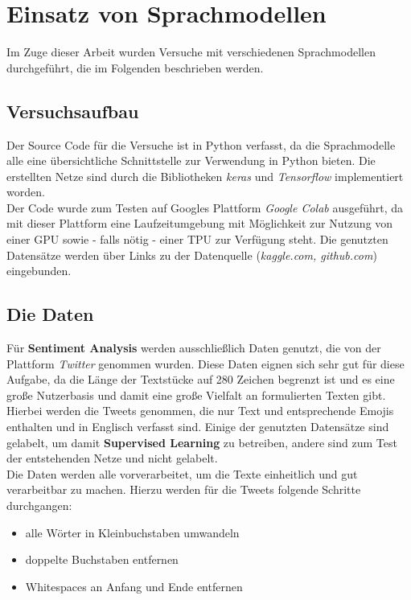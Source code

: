 \chapter{Einsatz von Sprachmodellen}
Im Zuge dieser Arbeit wurden Versuche mit verschiedenen Sprachmodellen durchgef\"uhrt, die im Folgenden beschrieben werden.

\section{Versuchsaufbau}
Der Source Code f\"ur die Versuche ist in Python verfasst, da die Sprachmodelle alle eine \"ubersichtliche Schnittstelle zur Verwendung in Python bieten. Die erstellten Netze sind durch die Bibliotheken \textit{keras} \cite{keras} und \textit{Tensorflow} \cite{tensorflow} implementiert worden. \\
Der Code wurde zum Testen auf Googles Plattform \textit{Google Colab} \cite{colab} ausgef\"uhrt, da mit dieser Plattform eine Laufzeitumgebung mit M\"oglichkeit zur Nutzung von einer GPU sowie - falls n\"otig - einer TPU zur Verf\"ugung steht. Die genutzten Datens\"atze werden \"uber Links zu der Datenquelle (\textit{kaggle.com, github.com}) eingebunden.


\section{Die Daten}
F\"ur \textbf{Sentiment Analysis} werden ausschlie{\ss}lich Daten genutzt, die von der Plattform \textit{Twitter} genommen wurden. Diese Daten eignen sich sehr gut f\"ur diese Aufgabe, da die L\"ange der Textst\"ucke auf 280 Zeichen begrenzt ist \cite{twitter} und es eine gro{\ss}e Nutzerbasis und damit eine gro{\ss}e Vielfalt an formulierten Texten gibt. Hierbei werden die Tweets genommen, die nur Text und entsprechende Emojis enthalten und in Englisch verfasst sind. Einige der genutzten Datens\"atze sind gelabelt, um damit \textbf{Supervised Learning} zu betreiben, andere sind zum Test der entstehenden Netze und nicht gelabelt.\\
Die Daten werden alle vorverarbeitet, um die Texte einheitlich und gut verarbeitbar zu machen. Hierzu werden f\"ur die Tweets folgende Schritte durchgangen:
\begin{itemize}
\item alle W\"orter in Kleinbuchstaben umwandeln
\item doppelte Buchstaben entfernen %
\item Whitespaces an Anfang und Ende entfernen
\end{itemize}

